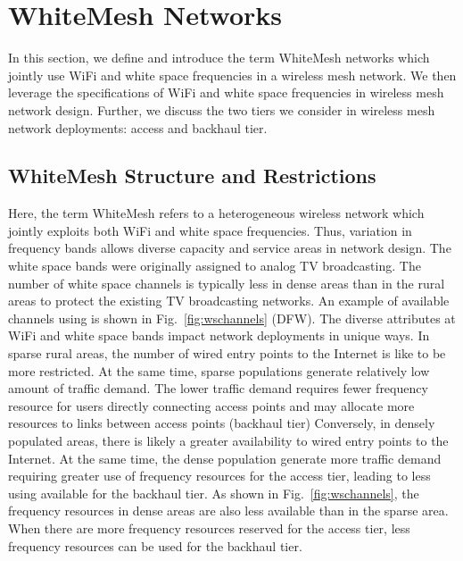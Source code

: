 \section{WhiteMesh Networks}
\label{sec:problemformulation}

In this section, we define and introduce the term WhiteMesh networks which jointly use WiFi and white space 
frequencies in a wireless mesh network. We then leverage the specifications of WiFi and white 
space frequencies in wireless mesh network design. Further, we discuss the two tiers we consider in 
wireless mesh network deployments: access and backhaul tier.


\subsection{WhiteMesh Structure and Restrictions}
\label{subsec:problem}
Here, the term WhiteMesh refers to a heterogeneous wireless network which jointly exploits 
both WiFi and white space frequencies. Thus, variation in frequency bands allows diverse 
capacity and service areas in network design.
The white space bands were originally assigned to analog TV broadcasting. The 
number of white space channels is typically less in dense areas than in the rural areas to protect the 
existing TV broadcasting networks. An example of available channels using is shown in Fig.~\ref{fig:wschannels} (DFW). 
The diverse attributes at WiFi and white space bands impact network deployments in unique ways.
In sparse rural areas, the number of wired entry points to the Internet is like to be more restricted. 
At the same time, sparse populations generate relatively low amount of traffic 
demand. The lower traffic demand requires fewer frequency resource for users directly connecting access points
and may allocate more resources to links between access points (backhaul tier)
Conversely, in densely populated areas, there is likely a greater availability to wired entry points to the Internet.
At the same time, the dense population generate more traffic demand requiring greater use of frequency resources
for the access tier, leading to less using available for the backhaul tier. 
As shown in Fig.~\ref{fig:wschannels}, the frequency resources in dense areas 
are also less available than in the sparse area. 
When there are more frequency resources reserved 
for the access tier, less frequency resources can be used for the backhaul tier.


